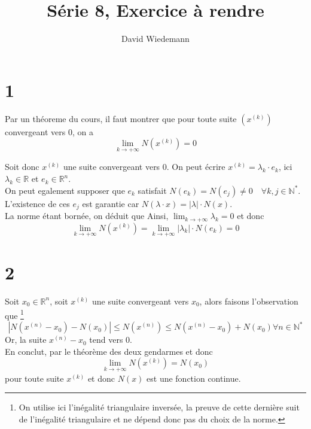 \documentclass[11pt, a4paper, twoside]{article}
\begin{document}
\title{Série 8, Exercice à rendre}
\author{David Wiedemann}
\maketitle
\section*{1}
Par un théoreme du cours, il faut montrer que pour toute suite $( x^{( k) }) $ convergeant vers 0, on a
\[ 
\lim_{k \to  + \infty} 	N( x^{( k) }) =0
\]

Soit donc $x^{( k) }$ une suite convergeant vers 0. On peut écrire $  x^{( k) }= \lambda_k\cdot e_k$, ici $\lambda_k \in \mathbb{R}$ et $e_k \in \mathbb{R}^{n}$.\\
On peut egalement supposer que $e_k$ satisfait $N( e_k ) = N( e_j ) \neq 0 \quad \forall k,j \in \mathbb{N}^{*} $. L'existence de ces $e_j$ est garantie car $N( \lambda \cdot x ) = |\lambda| \cdot N( x) $.\\
La norme étant bornée, on déduit que Ainsi, $\lim_{k \to  + \infty} \lambda_k = 0$ et donc
\[ 
	\lim_{k \to  + \infty} N( x^{( k) }) = \lim_{k \to  + \infty} | \lambda_k| \cdot N( e_k) = 0
\]
\section*{2}
Soit $x_0 \in \mathbb{R}^n$, soit $x^{( k) }$ une suite convergeant vers $x_0$, alors faisons l'observation que \footnote{On utilise ici l'inégalité triangulaire inversée, la preuve de cette dernière suit de l'inégalité triangulaire et ne dépend donc pas du choix de la norme.}
\[ 
	|N( x^{( n) }- x_0)  - N( x_0)|  \leq N(x^{( n) } ) \leq N(  x^{( n) }-x_0 )  + N( x_0) \forall n \in  \mathbb{N}^{*}
\]
Or, la suite $x^{( n) }- x_0$ tend vers 0.\\
En conclut, par le théorème des deux gendarmes et donc
\[ 
	\lim_{k \to  + \infty} N( x^{( k) }) = N( x_0) 
\]
pour toute suite $x^{( k) }$ et donc $N( x) $ est une fonction continue.
\end{document}
